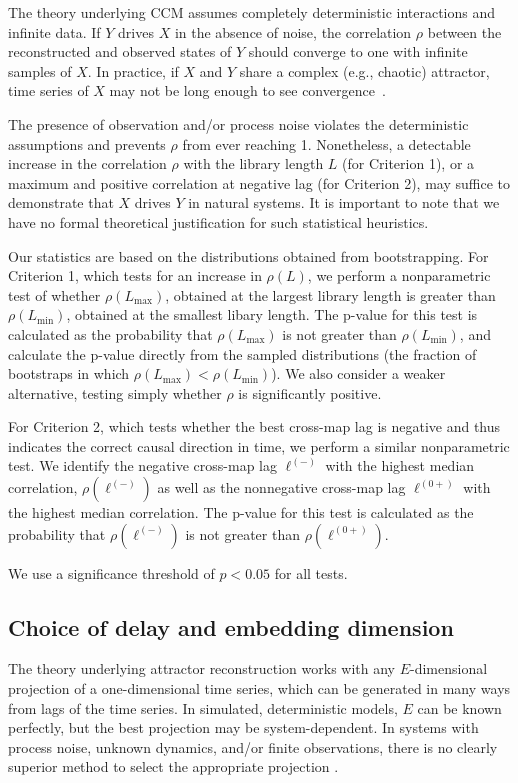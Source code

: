The theory underlying CCM assumes completely deterministic interactions and infinite data.
If $Y$ drives $X$ in the absence of noise, the correlation $\rho$ between the reconstructed and observed states of $Y$ should converge to one with infinite samples of $X$.
In practice, if $X$ and $Y$ share a complex (e.g., chaotic) attractor, time series of $X$ may not be long enough to see convergence~\cite{Sugihara2012}.

The presence of observation and/or process noise violates the deterministic assumptions and prevents $\rho$ from ever reaching 1.
Nonetheless, a detectable increase in the correlation $\rho$ with the library length $L$ (for Criterion 1), or a maximum and positive correlation at negative lag (for Criterion 2), may suffice to demonstrate that $X$ drives $Y$ in natural systems.
It is important to note that we have no formal theoretical justification for such statistical heuristics.

Our statistics are based on the distributions obtained from bootstrapping.
For Criterion 1, which tests for an increase in $\rho(L)$, we perform a nonparametric test of whether $\rho(L_{\max})$, obtained at the largest library length is greater than $\rho(L_{\min})$, obtained at the smallest libary length.
The p-value for this test is calculated as the probability that $\rho(L_{\max})$ is not greater than $\rho(L_{\min})$, and calculate the p-value directly from the sampled distributions (the fraction of bootstraps in which $\rho(L_{\max}) < \rho(L_{\min})$).
We also consider a weaker alternative, testing simply whether $\rho$ is significantly positive.

For Criterion 2, which tests whether the best cross-map lag is negative and thus indicates the correct causal direction in time, we perform a similar nonparametric test.
We identify the negative cross-map lag $\ell^{(-)}$ with the highest median correlation, $\rho(\ell^{(-)})$ as well as the nonnegative cross-map lag $\ell^{(0+)}$ with the highest median correlation.
The p-value for this test is calculated as the probability that $\rho(\ell^{(-)})$ is not greater than $\rho(\ell^{(0+)})$.

We use a significance threshold of $p<0.05$ for all tests.

\subsection*{Choice of delay and embedding dimension}
The theory underlying attractor reconstruction works with any $E$-dimensional projection of a one-dimensional time series, which can be generated in many ways from lags of the time series.
In simulated, deterministic models, $E$ can be known perfectly, but the best projection may be system-dependent.
In systems with process noise, unknown dynamics, and/or finite observations, there is no clearly superior method to select the appropriate projection \cite{Casdagli1991,Nichkawde2013,Uzal2011,Pecora2007, Cao1997, Small2004}.

